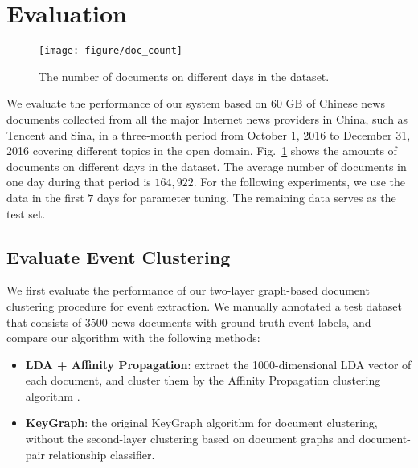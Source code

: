 \section{Evaluation}
\label{sec:eval}


\begin{figure}[t]
		\hspace{7mm}
        \texttt{[image: figure/doc\_count]}
        \vspace{-5mm}
        \caption{The number of documents on different days in the dataset.}
        \label{fig:docAmount}
        \vspace{-5mm}
\end{figure}




We evaluate the performance of our system based on 60 GB of Chinese news documents collected from all the major Internet news providers in China, such as Tencent and Sina, in a three-month period from October 1, 2016 to December 31, 2016 covering different topics in the open domain. Fig.~\ref{fig:docAmount} shows the amounts of documents on different days in the dataset. The average number of documents in one day during that period is $164,922$. For the following experiments, we use the data in the first $7$ days for parameter tuning. The remaining data serves as the test set.

\subsection{Evaluate Event Clustering}
\label{subsec:eval-clustering}

We first evaluate the performance of our two-layer graph-based document clustering procedure for event extraction. We manually annotated a test dataset that consists of $3500$ news documents with ground-truth event labels, and compare our algorithm with the following methods:
\begin{itemize}
	\item \textbf{LDA + Affinity Propagation}: extract the 1000-dimensional LDA vector of each document, and cluster them by the Affinity Propagation clustering algorithm \cite{guan2011text}.
	\item \textbf{KeyGraph}: the original KeyGraph algorithm \cite{sayyadi2013graph} for document clustering, without the second-layer clustering based on document graphs and document-pair relationship classifier.
\end{itemize}

